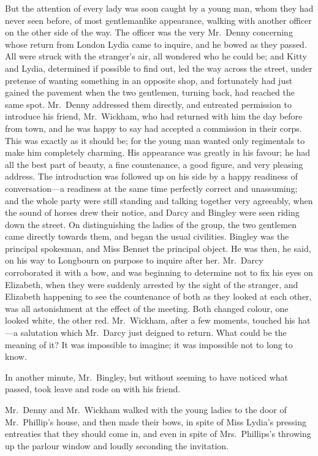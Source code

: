 But the attention of every lady was soon caught by a young man,
whom they had never seen before, of most gentlemanlike
appearance, walking with another officer on the other side of the
way.  The officer was the very Mr.\ Denny concerning whose
return from London Lydia came to inquire, and he bowed as
they passed.  All were struck with the stranger's air, all
wondered who he could be; and Kitty and Lydia, determined if
possible to find out, led the way across the street, under pretense
of wanting something in an opposite shop, and fortunately had
just gained the pavement when the two gentlemen, turning back,
had reached the same spot.  Mr.\ Denny addressed them directly,
and entreated permission to introduce his friend, Mr.\ Wickham,
who had returned with him the day before from town, and he
was happy to say had accepted a commission in their corps.
This was exactly as it should be; for the young man wanted only
regimentals to make him completely charming.  His appearance
was greatly in his favour; he had all the best part of beauty, a
fine countenance, a good figure, and very pleasing address.  The
introduction was followed up on his side by a happy readiness of
conversation---a readiness at the same time perfectly correct and
unassuming; and the whole party were still standing and talking
together very agreeably, when the sound of horses drew their
notice, and Darcy and Bingley were seen riding down the street.
On distinguishing the ladies of the group, the two gentlemen
came directly towards them, and began the usual civilities.
Bingley was the principal spokesman, and Miss Bennet the
principal object.  He was then, he said, on his way to Longbourn
on purpose to inquire after her.  Mr.\ Darcy corroborated it with
a bow, and was beginning to determine not to fix his eyes on
Elizabeth, when they were suddenly arrested by the sight of the
stranger, and Elizabeth happening to see the countenance of
both as they looked at each other, was all astonishment at the
effect of the meeting.  Both changed colour, one looked white,
the other red.  Mr.\ Wickham, after a few moments, touched his
hat---a salutation which Mr.\ Darcy just deigned to return.  What
could be the meaning of it?  It was impossible to imagine; it was
impossible not to long to know.

In another minute, Mr.\ Bingley, but without seeming to have
noticed what passed, took leave and rode on with his friend.

Mr.\ Denny and Mr.\ Wickham walked with the young ladies to
the door of Mr.\ Phillip's house, and then made their bows, in
spite of Miss Lydia's pressing entreaties that they should come
in, and even in spite of Mrs.\ Phillips's throwing up the parlour
window and loudly seconding the invitation.


